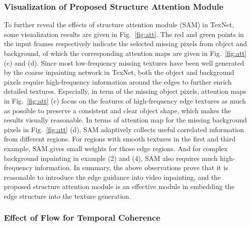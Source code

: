 \subsubsection{Visualization of Proposed Structure Attention Module}
To further reveal the effects of structure attention module (SAM) in TexNet, some visualization results are given in Fig.~\ref{fig:att}.
The red and green points in the input frames respectively indicate the selected missing pixels from object and background, of which the corresponding attention maps are given in Fig.~\ref{fig:att} (c) and (d).
Since most low-frequency missing textures have been well generated by the coarse inpainting network in TexNet, both the object and background pixels require high-frequency information around the edges to further enrich detailed textures.
Especially, in term of the missing object pixels, attention maps in Fig.~\ref{fig:att} (c) focus on the features of high-frequency edge textures as much as possible to preserve a consistent and clear object shape, which makes the results visually reasonable.
In terms of attention map for the missing background pixels in Fig.~\ref{fig:att} (d), SAM adaptively collects useful correlated information from different regions. For regions with smooth textures in the first and third example, SAM gives small weights for those edge regions. And for complex background inpainting in example (2) and (4), SAM also requires much high-frequency information.
In summary, the above observations prove that it is reasonable to introduce the edge guidance into video inpainting, and the proposed structure attention module is an effective module in embedding the edge structure into the texture generation.








\subsubsection{Effect of Flow for Temporal Coherence}

